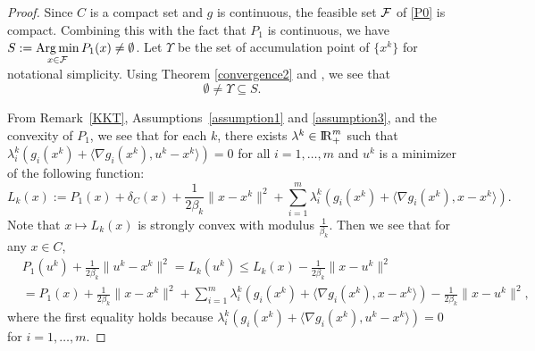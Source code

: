 \documentclass[10pt]{article}
\numberwithin{equation}{section}
\def\R{{\rm I\!R}}
\def\Argmin{\mathop{\rm Arg\,min}}
\begin{document}
\begin{proof}
Since $C$ is a compact set and $g$ is continuous, the feasible set ${\cal F}$ of \eqref{P0} is compact. Combining this with the fact that $P_1$ is continuous, we have $S:= \Argmin\limits_{x\in {\cal F}} P_1(x) \not=\emptyset$. Let $\Upsilon$ be the set of accumulation point of $\{x^k\}$ for notational simplicity. Using Theorem \ref{convergence2} and \cite[Theorem~28.3]{Ro70}, we see that
\[
\emptyset\not=\Upsilon\subseteq S.
\]

From Remark~\ref{KKT}, Assumptions~\ref{assumption1} and \ref{assumption3}, and the convexity of $P_1$, we see that for each $k$, there exists $\lambda^k \in \R^m_+$ such that $\lambda^k_i(g_i(x^k) + \langle \nabla g_i(x^k), u^k - x^k\rangle) = 0$ for all $i = 1, \ldots, m$ and $u^k$ is a minimizer of the following function:
\[
L_k(x):= P_1(x) + \delta_C(x) + \frac{1}{2\beta_k}\|x - x^k\|^2 + \sum\limits_{i = 1}^m\lambda^k_i(g_i(x^k) + \langle \nabla g_i(x^k), x - x^k\rangle).
\]
Note that $x\mapsto L_k(x)$ is strongly convex with modulus $\frac1{\beta_k}$. Then we see that for any $x\in C$,
\begin{equation}\label{lagrange}
\begin{aligned}
&P_1(u^k) + \frac{1}{2\beta_k}\|u^k - x^k\|^2= L_k(u^k)\leq L_k(x) - \frac{1}{2\beta_k}\|x - u^k\|^2\\
&= P_1(x) + \frac{1}{2\beta_k}\|x - x^k\|^2 + \sum\limits_{i = 1}^m\lambda^k_i(g_i(x^k) + \langle \nabla g_i(x^k), x - x^k\rangle) - \frac{1}{2\beta_k}\|x - u^k\|^2,
\end{aligned}
\end{equation}
where the first equality holds because $\lambda^k_i(g_i(x^k) + \langle \nabla g_i(x^k), u^k - x^k\rangle) = 0$ for $i = 1, \ldots, m$.


\end{proof}
\end{document}
